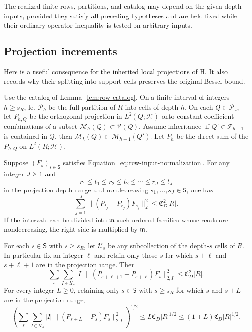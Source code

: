 The realized finite rows, partitions, and catalog may depend on the given
depth inputs, provided they satisfy all preceding hypotheses and are held
fixed while their ordinary operator inequality is tested on arbitrary inputs.

\subsection{Projection increments}

Here is a useful consequence for the inherited local projections
of H.  It also records why their splitting into support cells
preserves the original Bessel bound.

\begin{corollary}
\label{cor:row-projections}
Use the catalog of Lemma~\ref{lem:row-catalog}.  On a finite
interval of integers $h\ge s_R$, let $\mathcal P_h$ be the full
partition of $R$ into cells of depth $h$.  On each
$Q\in\mathcal P_h$, let $P_{h,Q}$ be the orthogonal projection in
$L^2(Q;\mathcal H)$ onto constant-coefficient combinations of
a subset $\mathcal M_h(Q)\subset\mathcal V(Q)$.  Assume inheritance:
if $Q'\in\mathcal P_{h+1}$ is contained in $Q$, then
$\mathcal M_h(Q)\subset\mathcal M_{h+1}(Q')$.  Let $P_h$ be the
direct sum of the $P_{h,Q}$ on $L^2(R;\mathcal H)$.

Suppose $(F_s)_{s\in\mathsf S}$ satisfies
Equation~\eqref{eq:row-input-normalization}.  For any integer $J\ge1$ and
\[
 r_1\le t_1\le r_2\le t_2\le\cdots\le r_J\le t_J
\]
in the projection depth range and nondecreasing
$s_1,\ldots,s_J\in\mathsf S$, one has
\begin{equation}
 \sum_{j=1}^J\|(P_{t_j}-P_{r_j})F_{s_j}\|_2^2
 \le \mathfrak C_D^2|R|.
 \label{eq:row-disjoint-increments}
\end{equation}
If the intervals can be divided into $\mathfrak m$ such ordered
families whose reads are nondecreasing, the right side is multiplied
by $\mathfrak m$.

For each $s\in\mathsf S$ with $s\ge s_R$, let $\mathcal U_s$ be any
subcollection of the depth-$s$ cells of $R$.  In particular fix an integer
$\ell$ and retain only those $s$ for which $s+\ell$ and $s+\ell+1$ are in
the projection range.  Then
\begin{equation}
 \sum_s\sum_{I\in\mathcal U_s}|I|\,
       \|(P_{s+\ell+1}-P_{s+\ell})F_s\|_{2,I}^2
 \le \mathfrak C_D^2|R|.
 \label{eq:row-increment}
\end{equation}
For every integer $L\ge0$, retaining only $s\in\mathsf S$ with $s\ge s_R$
for which $s$ and $s+L$ are in the projection range,
\begin{equation}
 \left(\sum_s\sum_{I\in\mathcal U_s}|I|\,
       \|(P_{s+L}-P_s)F_s\|_{2,I}^2\right)^{1/2}
 \le L\mathfrak C_D|R|^{1/2}
 \le (1+L)\mathfrak C_D|R|^{1/2}.
 \label{eq:row-delay}
\end{equation}
\end{corollary}

